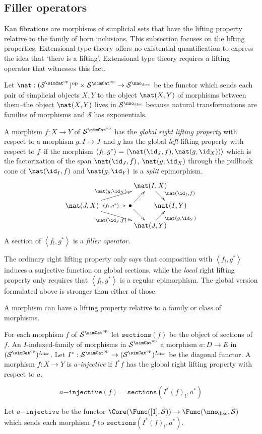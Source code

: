 \documentclass{tac}
\newcommand\cat\mathcal
\newcommand\ri{^*}
\newcommand\dual{^{\mathrm{op}}}
\newcommand\disc{_{\mathrm{disc}}}
\newcommand\s{^{\simCat\dual}}
\newcommand\bang{!}
\newcommand\of{:}
\newcommand\tuplet[1]{\left\langle #1 \right\rangle}
\newcommand\code\mathtt
\begin{document}
\subsection{Filler operators}
Kan fibrations are morphisms of simplicial sets that have the lifting property relative to the family of horn inclusions. This subsection focuses on the lifting properties. Extensional type theory offers no existential quantification to express the idea that `there is a lifting'. Extensional type theory requires a lifting operator that witnesses this fact.

\begin{definition} Let $\nat\of(\cat S\s)\dual\times \cat S\s \to \cat S^{\nno\disc}$ be the functor which sends each pair of simplicial objects $X,Y$ to the object $\nat(X,Y)$ of morphisms between them--the object $\nat(X,Y)$ lives in $\cat S^{\nno\disc}$ because natural transformations are families of morphisms and $\cat S$ has exponentials.

A morphism $f\of X\to Y$ of $\cat S\s$ has the \emph{global right lifting property} with respect to a morphism $g\of I\to J$--and $g$ has the global \emph{left} lifting property with respect to $f$--if the morphism $\tuplet{f_!,g\ri} = \tuplet{\nat(\id_J,f),\nat(g,\id_X))}$ 
which is the factorization of the span $\nat(\id_J,f)$, $\nat(g,\id_X)$ through the pullback cone of $\nat(\id_I,f)$ and $\nat(g,\id_Y)$
is a \emph{split} epimorphism.
\[\xy
(34,20)*+{\nat(I,X)}="top",(0,10)*+{\nat(J,X)}="left",(24,10)*+{\bullet}="middle",(44,10)*+{\nat(I,Y)}="right",(34,0)*+{\nat(J,Y)}="bottom"
\ar^{\nat(g,\id_X)} "left";"top" \ar@{.>}|(.6){\tuplet{f_!,g\ri}} "left";"middle" \ar_{\nat(\id_J,f)} "left";"bottom" \ar "middle";"bottom"
\ar "middle";"top" \ar^(.6){\nat(\id_I,f)} "top";"right" \ar_(.6){\nat(g,\id_Y)} "bottom";"right"
\endxy\]
A section of $\tuplet{f_\bang,g\ri}$ is a \emph{filler operator}.\label{lifting}
\end{definition}

The ordinary right lifting property only says that composition with $\tuplet{f_\bang,g\ri}$ induces a surjective function on global sections, while the \emph{local} right lifting property only requires that $\tuplet{f_\bang,g\ri}$ is a regular epimorphism. The global version formulated above is stronger than either of those.

A morphism can have a lifting property relative to a family or class of morphisms.

\begin{definition}[Injective]  For each morphism $f$ of $\cat S\s$ let $\code{sections}(f)$ be the object of sections of $f$. An $I$-indexed-family of morphisms in $\cat S\s$ a morphism $a\of D\to E$ in $(\cat S\s)^{I\disc}$. Let $I\ri\of\cat S\s\to (\cat S\s)^{I\disc}$ be the diagonal functor. A morphism $f\of X\to Y$ is \emph{$a$-injective} if $I\ri f$ has the global right lifting property with respect to $a$.

\[ a\code{-injective}(f)=\code{sections}(I\ri(f)_\bang,a\ri) \] %

Let $a\code{-injective}$ be the functor $\Core(\Func([1],\cat S))\to\Func(\nno\disc,\cat S)$ which sends each morphism $f$ to $\code{sections}(I\ri(f)_\bang,a\ri)$.
\end{definition}
\end{document}
